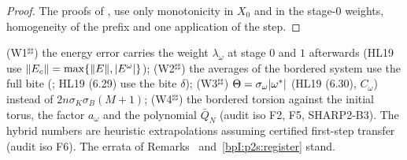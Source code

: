 \begin{proof}
\label{stepI:p2s2:ff}
The proofs of ,  use only monotonicity in $X_0$ and in the stage-$0$ weights, homogeneity of the prefix and one
application of the step.
\end{proof}

\begin{remark}[Deviations]\label{bpI:p2s2:dev}
(W1$^{\sharp\sharp}$) the energy error carries the weight $\lambda_\omega$ at stage $0$ and $1$ afterwards (HL19 use $\lVert E_c\rVert=\max\{\lVert E\rVert,\lvert E^\omega\rvert\}$);
(W2$^{\sharp\sharp}$) the averages of the bordered system use the full bite (; HL19 (6.29) use the bite $\delta$);
(W3$^{\sharp\sharp}$) $\Theta=\sigma_\omega\lvert \omega^*\rvert$ (HL19 (6.30), $C_\omega$) instead of $2n\sigma_K\sigma_B(M+1)$;
(W4$^{\sharp\sharp}$) the bordered torsion against the initial torus, the factor $a_\omega$ and the polynomial $\bar Q_N$ (audit iso F2, F5, SHARP2-B3).
The hybrid numbers are heuristic extrapolations assuming certified first-step transfer (audit iso F6). The errata of Remarks~
and~\ref{bpI:p2s:register} stand.
\end{remark}
